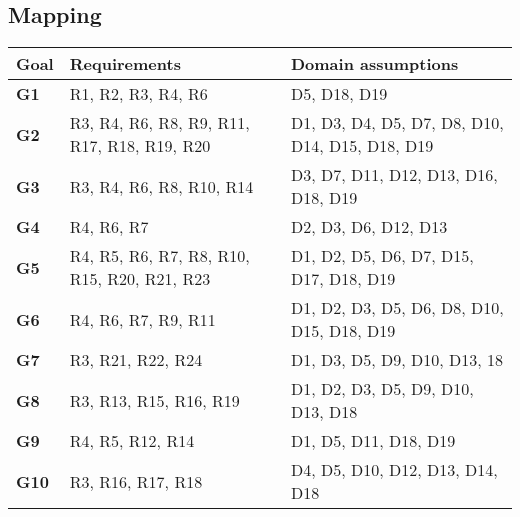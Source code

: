\subsection{Mapping}
\begin{center}
    {\renewcommand{\arraystretch}{2}
    \begin{longtable}{L{2cm}L{6cm}L{6cm}}
        \hline
        \textbf{Goal} & \textbf{Requirements} & \textbf{Domain assumptions} \\
        \hline
        \textbf{G1} & R1, R2, R3, R4, R6 & D5, D18, D19 \\
        \hline
        \textbf{G2} & R3, R4, R6, R8, R9, R11, R17, R18, R19, R20 & D1, D3, D4, D5, D7, D8, D10, D14, D15, D18, D19 \\
        \hline
        \textbf{G3} & R3, R4, R6, R8, R10, R14 & D3, D7, D11, D12, D13, D16, D18, D19 \\
        \hline
        \textbf{G4} & R4, R6, R7 & D2, D3, D6, D12, D13 \\
        \hline
        \textbf{G5} & R4, R5, R6, R7, R8, R10, R15, R20, R21, R23 & D1, D2, D5, D6, D7, D15, D17, D18, D19 \\
        \hline
        \textbf{G6} & R4, R6, R7, R9, R11 & D1, D2, D3, D5, D6, D8, D10, D15, D18, D19 \\
        \hline
        \textbf{G7} & R3, R21, R22, R24 & D1, D3, D5, D9, D10, D13, 18 \\
        \hline
        \textbf{G8} & R3, R13, R15, R16, R19 & D1, D2, D3, D5, D9, D10, D13, D18 \\
        \hline
        \textbf{G9} & R4, R5, R12, R14 & D1, D5, D11, D18, D19 \\
        \hline
        \textbf{G10} & R3, R16, R17, R18 & D4, D5, D10, D12, D13, D14, D18 \\
        \hline
    \end{longtable}}


\end{center}
